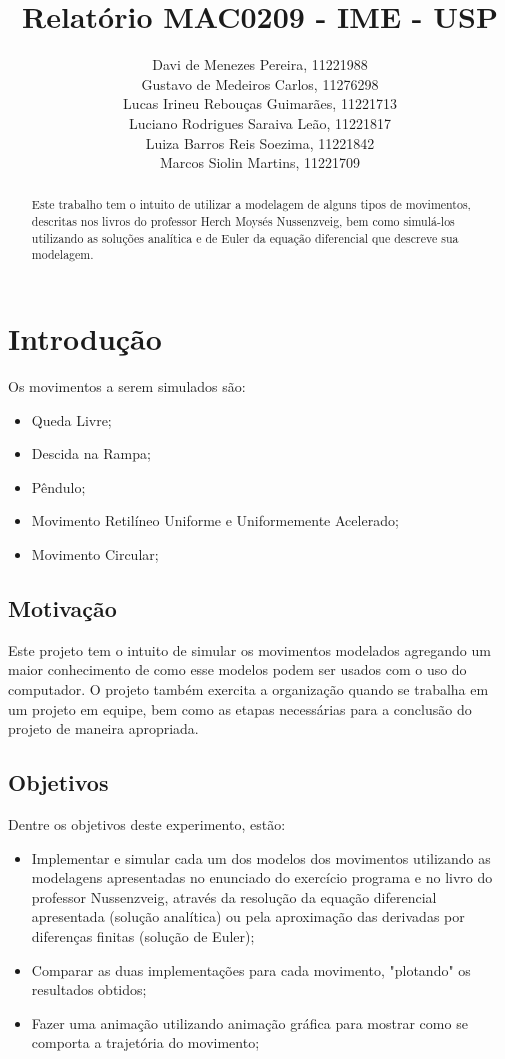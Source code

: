 \documentclass[12pt]{article}
\title{Relatório MAC0209 - IME - USP}
\author{Davi de Menezes Pereira, 11221988\\
Gustavo de Medeiros Carlos, 11276298\\
Lucas Irineu Rebouças Guimarães, 11221713\\
Luciano Rodrigues Saraiva Leão, 11221817\\
Luiza Barros Reis Soezima, 11221842\\
Marcos Siolin Martins, 11221709}
\begin{document}
\maketitle

\begin{abstract}
    Este trabalho tem o intuito de utilizar a modelagem de alguns tipos de movimentos, descritas nos livros do professor Herch Moysés Nussenzveig, bem como simulá-los utilizando as soluções analítica e de Euler da equação diferencial que descreve sua modelagem.    
\end{abstract}

\tableofcontents

\newpage

\section{Introdução}

Os movimentos a serem simulados são:
\begin{itemize}
  \item Queda Livre;
  \item Descida na Rampa;
  \item Pêndulo;
  \item Movimento Retilíneo Uniforme e Uniformemente Acelerado;
  \item Movimento Circular;
\end{itemize}

\subsection{Motivação}

Este projeto tem o intuito de simular os movimentos modelados agregando um maior conhecimento de como esse modelos podem ser usados com o uso do computador. O projeto também exercita a organização quando se trabalha em um projeto em equipe, bem como as etapas necessárias para a conclusão do projeto de maneira apropriada.

\subsection{Objetivos}

Dentre os objetivos deste experimento, estão:
\begin{itemize}
  \item Implementar e simular cada um dos modelos dos movimentos utilizando as modelagens apresentadas no enunciado do exercício programa e no livro do professor Nussenzveig, através da resolução da equação diferencial apresentada (solução analítica) ou pela aproximação das derivadas por diferenças finitas (solução de Euler);
  \item Comparar as duas implementações para cada movimento, "plotando" os resultados obtidos;
  \item Fazer uma animação utilizando animação gráfica para mostrar como se comporta a trajetória do movimento;
\end{itemize}
\end{document}
